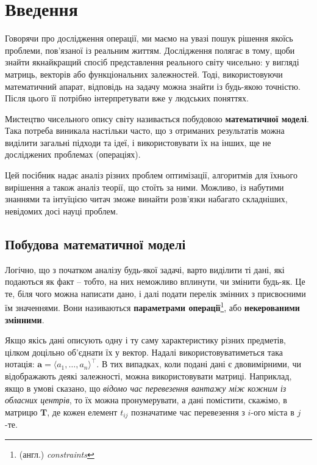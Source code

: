 \documentclass[../book.tex]{subfiles}
\begin{document}
\chapter{Введення}

Говорячи про \flqq{}дослідження операції\frqq{}, ми маємо на увазі пошук рішення якоїсь проблеми, пов'язаної із реальним життям. Дослідження полягає в тому, щоби знайти якнайкращий спосіб представлення реального світу чисельно: у вигляді матриць, векторів або функціональних залежностей. Тоді, використовуючи математичний апарат, відповідь на задачу можна знайти із будь-якою точністю. Після цього її потрібно інтерпретувати вже у \flqq{}людських\frqq{} поняттях.

Мистецтво чисельного опису світу називається побудовою \textbf{математичної моделі}. Така потреба виникала настільки часто, що з отриманих результатів можна виділити загальні підходи та ідеї, і використовувати їх на інших, ще не досліджених проблемах (операціях).

Цей посібник надає аналіз різних проблем оптимізації, алгоритмів для їхнього вирішення а також аналіз теорії, що стоїть за ними. Можливо, із набутими знаннями та інтуїцією читач зможе винайти розв'язки набагато складніших, невідомих досі науці проблем.

\section{Побудова математичної моделі}

Логічно, що з початком аналізу будь-якої задачі, варто виділити ті дані, які подаються як факт -- тобто, на них неможливо вплинути, чи змінити будь-як. Це те, біля чого можна написати \flqq{}дано\frqq{}, і далі подати перелік змінних з присвоєними їм значеннями. Вони називаються \textbf{параметрами операції}\footnote{(англ.) \textit{constraints}}, або \textbf{некерованими змінними}.

Якщо якісь дані описують одну і ту саму характеристику різних предметів, цілком доцільно об'єднати їх у вектор. Надалі використовуватиметься така нотація: $\mathbf{a} = \langle a_1, \ldots, a_n \rangle^\top$. В тих випадках, коли подані дані є двовимірними, чи відображають деякі залежності, можна використовувати матриці. Наприклад, якщо в умові сказано, що \textit{відомо час перевезення вантажу між кожним із обласних центрів}, то їх можна пронумерувати, а дані помістити, скажімо, в матрицю $\mathbf{T}$, де кожен елемент $t_{ij}$ позначатиме час перевезення з $i$-ого міста в $j$-те.
\end{document}
